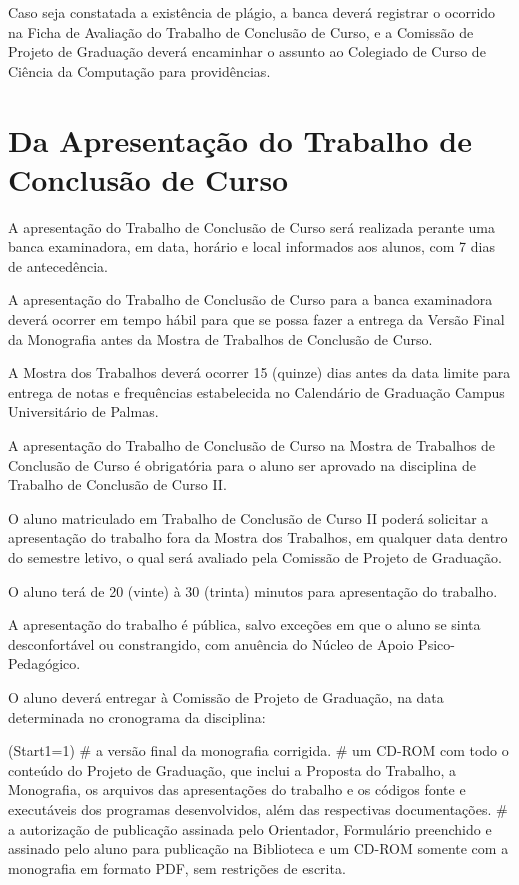 \documentclass[12pt,geral,titlewithdate]{uftdocs}
\begin{document}
\artigo Caso seja constatada a existência de plágio, a banca deverá registrar o ocorrido na Ficha de Avaliação do Trabalho de Conclusão de Curso, e a Comissão de Projeto de Graduação deverá encaminhar o assunto ao Colegiado de Curso de Ciência da Computação para providências. 

\chapter{Da Apresentação do Trabalho de Conclusão de Curso}

\artigo A apresentação do Trabalho de Conclusão de Curso será realizada perante uma banca examinadora, em data, horário e local informados aos alunos, com 7 dias de antecedência.

\begin{paragrafos}
\paragrafo A apresentação do Trabalho de Conclusão de Curso para a banca examinadora deverá ocorrer em tempo hábil para que se possa fazer a entrega da Versão Final da Monografia antes da Mostra de Trabalhos de Conclusão de Curso.

\paragrafo A Mostra dos Trabalhos deverá ocorrer  15 (quinze) dias antes da data limite para entrega de notas e frequências estabelecida no Calendário de Graduação Campus Universitário de Palmas.

\paragrafo A apresentação do Trabalho de Conclusão de Curso na Mostra de Trabalhos de Conclusão de Curso é obrigatória para o aluno ser aprovado na disciplina de Trabalho de Conclusão de Curso II.

\paragrafo O aluno matriculado em Trabalho de Conclusão de Curso II poderá solicitar a apresentação do trabalho fora da Mostra dos Trabalhos, em qualquer data dentro do semestre letivo, o qual será avaliado pela Comissão de Projeto de Graduação.

\paragrafo O aluno terá de 20 (vinte) à 30 (trinta) minutos para apresentação do trabalho.

\paragrafo A apresentação do trabalho é pública, salvo exceções em que o aluno se sinta desconfortável ou constrangido, com anuência do Núcleo de Apoio Psico-Pedagógico.

\end{paragrafos}

\artigo O aluno deverá entregar à Comissão de Projeto de Graduação, na data determinada no cronograma da disciplina:

\begin{easylist}\ListProperties(Start1=1)
# a versão final da monografia corrigida.
# um CD-ROM com todo o conteúdo do Projeto de Graduação, que inclui a Proposta do Trabalho, a Monografia, os arquivos das apresentações do trabalho e os códigos fonte e executáveis dos programas desenvolvidos, além das respectivas documentações.
#  a autorização de publicação assinada pelo Orientador, Formulário preenchido e assinado pelo aluno para publicação na Biblioteca e um CD-ROM somente com a monografia em formato PDF, sem restrições de escrita.
\end{easylist}
\end{document}
